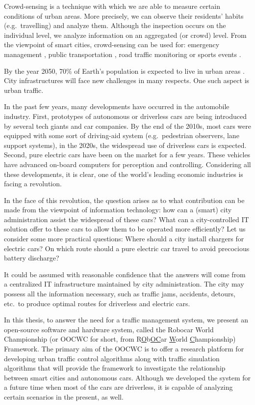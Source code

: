 \documentclass[b5paper,12pt]{report}
\theoremstyle{definition}
\begin{document}
Crowd-sensing is a technique with which we are able to measure certain conditions of urban areas. More precisely, we can observe their residents' habits (e.g.\ travelling) and analyze them. Although the inspection occurs on the individual level, we analyze information on an aggregated (or crowd) level. From the viewpoint of smart cities, crowd-sensing can be used for: emergency management \cite{du2012research}, public transportation \cite{szabo2013framework}, road traffic monitoring \cite{mohan2008nericell} or sports events \cite{besenczi2013kozossegi}.

By the year 2050, 70\% of Earth's population is expected to live in urban areas \cite{bocquier2005world}. City infrastructures will face new challenges in many respects. One such aspect is urban traffic.

In the past few years, many developments have occurred in the automobile industry. First, prototypes of autonomous or driverless cars are being introduced by several tech giants and car companies. By the end of the 2010s, most cars were equipped with some sort of driving-aid system (e.g.\ pedestrian observers, lane support systems), in the 2020s, the widespread use of driverless cars is expected. Second, pure electric cars have been on the market for a few years. These vehicles have advanced on-board computers for perception and controlling. Considering all these developments, it is clear, one of the world's leading economic industries is facing a revolution.

In the face of this revolution, the question arises as to what contribution can be made from the viewpoint of information technology: how can a (smart) city administration assist the widespread of these cars? What can a city-controlled IT solution offer to these cars to allow them to be operated more efficiently? Let us consider some more practical questions: Where should a city install chargers for electric cars? On which route should a pure electric car travel to avoid precocious battery discharge?

It could be assumed with reasonable confidence that the answers will come from a centralized IT infrastructure maintained by city administration. The city may possess all the information necessary, such as traffic jams, accidents, detours, etc.~to produce optimal routes for driverless and electric cars.

In this thesis, to answer the need for a traffic management system, we present an open-source software and hardware system, called the Robocar World Championship (or OOCWC for short, from R\underline{O}b\underline{OC}ar \underline{W}orld \underline{C}hampionship) Framework. The primary aim of the OOCWC is to offer a research platform for developing urban traffic control algorithms along with traffic simulation algorithms that will provide the framework to investigate the relationship between smart cities and autonomous cars. Although we developed the system for a future time when most of the cars are driverless, it is capable of analyzing certain scenarios in the present, as well.
\end{document}
